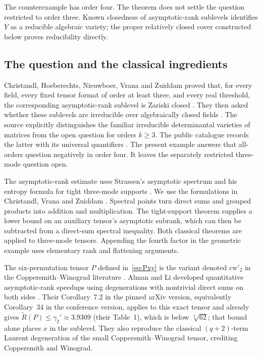 \documentclass[10pt,a4paper]{article}
\theoremstyle{definition}
\theoremstyle{remark}
\numberwithin{equation}{section}
\begin{document}
The counterexample has order four. The theorem does not settle the
question restricted to order three. Known closedness of asymptotic-rank
sublevels identifies $Y$ as a reducible algebraic variety; the proper
relatively closed cover constructed below proves reducibility directly.

\subsection{The question and the classical ingredients}\label{sec:history}
Christandl, Hoeberechts, Nieuwboer, Vrana and Zuiddam proved that, for
every field, every fixed tensor format of order at least three, and
every real threshold, the corresponding asymptotic-rank sublevel is
Zariski closed \cite[Theorem~1.2]{CHNVZ2024}.
They then asked whether these sublevels are irreducible over
algebraically closed fields \cite[Section~5]{CHNVZ2024}.
The source explicitly distinguishes the familiar irreducible
determinantal varieties of matrices from the open question for
orders $k\geq3$.  The public catalogue records the latter with its
universal quantifiers \cite{CatalogueIrreducibility}.
The present example answers that all-orders question negatively in
order four.  It leaves the separately restricted three-mode question
open.

The asymptotic-rank estimate uses Strassen's asymptotic spectrum and
his entropy formula for tight three-mode supports
\cite{Strassen1988,Strassen1991}.  We use the formulations in
Christandl, Vrana and Zuiddam
\cite[Theorem~1.1, Proposition~1.6, Definition~4.1,
Theorem~4.4 and Corollary~4.5]{CVZ2018}.
Spectral points turn direct sums and grouped products into addition
and multiplication.  The tight-support theorem supplies a lower
bound on an auxiliary tensor's asymptotic subrank, which can then
be subtracted from a direct-sum spectral inequality.  Both classical
theorems are applied to three-mode tensors.  Appending the fourth
factor in the geometric example uses elementary rank and flattening
arguments.

The six-permutation tensor $P$ defined in~\eqref{eq:Pxy} is the variant denoted $\mathrm{cw}'_2$
in the Coppersmith--Winograd literature
\cite{CoppersmithWinograd1990,AlmanLi2026}.
Alman and Li developed quantitative asymptotic-rank speedups using
degenerations with nontrivial direct sums on both sides
\cite[Sections~4 and~7.1]{AlmanLi2026}.  Their Corollary~7.2 in the
pinned arXiv version, equivalently Corollary~34 in the conference
version, applies to this exact tensor and already gives
$\widetilde R(P)\leq\gamma_2'\approx3.9309$ (their Table~1), which is
below $\sqrt[3]{62}$; that bound alone places $x$ in the sublevel.  They also reproduce the classical
$(q+2)$-term Laurent degeneration of the small
Coppersmith--Winograd tensor, crediting Coppersmith and Winograd.
\end{document}
